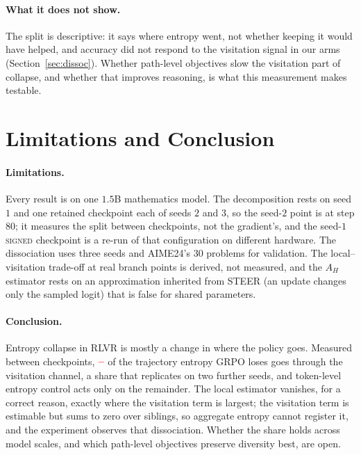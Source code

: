 \documentclass[runningheads]{llncs}
\newcommand{\AH}{A_{H}}
\providecommand{\PENDING}{\textcolor{red}{\textbf{--}}}
\newcommand{\num}[1]{\ifcsname #1\endcsname\csname #1\endcsname\else\PENDING\fi}
\begin{document}
\paragraph{What it does not show.} The split is descriptive: it says where entropy went,
not whether keeping it would have helped, and accuracy did not respond to the
visitation signal in our arms (Section~\ref{sec:dissoc}). Whether path-level objectives
slow the visitation part of collapse, and whether that improves reasoning, is what this
measurement makes testable.

\section{Limitations and Conclusion}
\label{sec:conclusion}

\paragraph{Limitations.} Every result is on one $1.5$B mathematics model. The
decomposition rests on seed $1$ and one retained checkpoint each of seeds $2$ and $3$,
so the seed-$2$ point is at step $80$; it measures the split between checkpoints, not
the gradient's, and the seed-$1$ \textsc{signed} checkpoint is a re-run of that
configuration on different hardware. The dissociation uses three seeds and AIME24's
$30$ problems for validation. The local--visitation trade-off at real branch points is
derived, not measured, and the $\AH$ estimator rests on an approximation inherited from
STEER (an update changes only the sampled logit) that is false for shared parameters.

\paragraph{Conclusion.} Entropy collapse in RLVR is mostly a change in where the policy
goes. Measured between checkpoints, $\num{DecGrpoShare}$ of the trajectory entropy GRPO
loses goes through the visitation channel, a share that replicates on two further
seeds, and token-level entropy control acts only on the remainder. The local estimator
vanishes, for a correct reason, exactly where the visitation term is largest; the
visitation term is estimable but sums to zero over siblings, so aggregate entropy
cannot register it, and the experiment observes that dissociation. Whether the share
holds across model scales, and which path-level objectives preserve diversity best, are
open.
\end{document}
